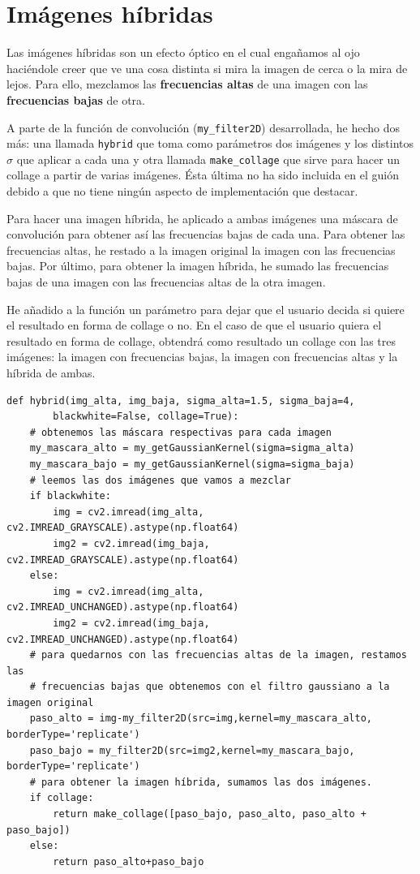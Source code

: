 \documentclass[11pt,a4paper]{article}
\theoremstyle{plain}
\theoremstyle{definition}
\begin{document}
\section{Imágenes híbridas}

Las imágenes híbridas son un efecto óptico en el cual engañamos al ojo haciéndole creer que ve una cosa distinta si mira la imagen de cerca o la mira de lejos. Para ello, mezclamos las \textbf{frecuencias altas} de una imagen con las \textbf{frecuencias bajas} de otra. 

A parte de la función de convolución (\texttt{my\_filter2D}) desarrollada, he hecho dos más: una llamada \texttt{hybrid} que toma como parámetros dos imágenes y los distintos $\sigma$ que aplicar a cada una y otra llamada \texttt{make\_collage} que sirve para hacer un collage a partir de varias imágenes. Ésta última no ha sido incluida en el guión debido a que no tiene ningún aspecto de implementación que destacar.

Para hacer una imagen híbrida, he aplicado a ambas imágenes una máscara de convolución para obtener así las frecuencias bajas de cada una. Para obtener las frecuencias altas, he restado a la imagen original la imagen con las frecuencias bajas. Por último, para obtener la imagen híbrida, he sumado las frecuencias bajas de una imagen con las frecuencias altas de la otra imagen. 

He añadido a la función un parámetro para dejar que el usuario decida si quiere el resultado en forma de collage o no. En el caso de que el usuario quiera el resultado en forma de collage, obtendrá como resultado un collage con las tres imágenes: la imagen con frecuencias bajas, la imagen con frecuencias altas y la híbrida de ambas.

\begin{verbatim}
def hybrid(img_alta, img_baja, sigma_alta=1.5, sigma_baja=4, 
        blackwhite=False, collage=True):
    # obtenemos las máscara respectivas para cada imagen
    my_mascara_alto = my_getGaussianKernel(sigma=sigma_alta)
    my_mascara_bajo = my_getGaussianKernel(sigma=sigma_baja)
    # leemos las dos imágenes que vamos a mezclar
    if blackwhite:
        img = cv2.imread(img_alta, cv2.IMREAD_GRAYSCALE).astype(np.float64)
        img2 = cv2.imread(img_baja, cv2.IMREAD_GRAYSCALE).astype(np.float64)
    else:
        img = cv2.imread(img_alta, cv2.IMREAD_UNCHANGED).astype(np.float64)
        img2 = cv2.imread(img_baja, cv2.IMREAD_UNCHANGED).astype(np.float64)
    # para quedarnos con las frecuencias altas de la imagen, restamos las 
    # frecuencias bajas que obtenemos con el filtro gaussiano a la imagen original
    paso_alto = img-my_filter2D(src=img,kernel=my_mascara_alto, borderType='replicate')
    paso_bajo = my_filter2D(src=img2,kernel=my_mascara_bajo, borderType='replicate')
    # para obtener la imagen híbrida, sumamos las dos imágenes.
    if collage:
        return make_collage([paso_bajo, paso_alto, paso_alto + paso_bajo])
    else:
        return paso_alto+paso_bajo
\end{verbatim}
\end{document}
